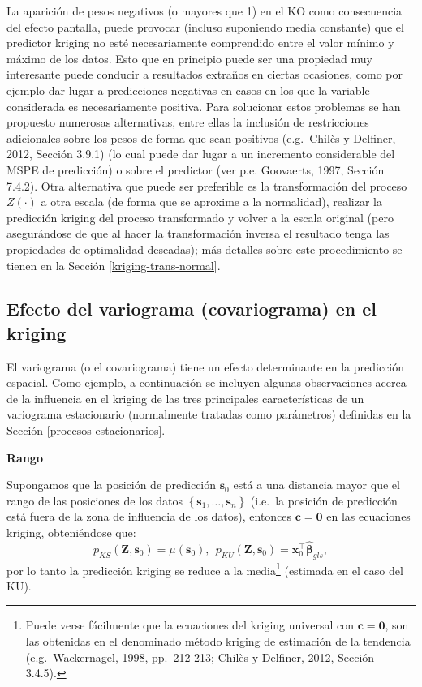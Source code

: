 \documentclass[
]{book}
\theoremstyle{break}
\theoremstyle{definition}
\theoremstyle{definition}
\theoremstyle{definition}
\theoremstyle{definition}
\theoremstyle{remark}
\begin{document}
La aparición de pesos negativos (o mayores que 1) en el KO como consecuencia del efecto pantalla, puede provocar (incluso suponiendo media constante) que el predictor kriging no esté necesariamente comprendido entre el valor mínimo y máximo de los datos.
Esto que en principio puede ser una propiedad muy interesante puede conducir a resultados extraños en ciertas ocasiones, como por ejemplo dar lugar a predicciones negativas en casos en los que la variable considerada es necesariamente positiva.
Para solucionar estos problemas se han propuesto numerosas alternativas, entre ellas la inclusión de restricciones adicionales sobre los pesos de forma que sean positivos (e.g.~Chilès y Delfiner, 2012, Sección 3.9.1) (lo cual puede dar lugar a un incremento considerable del MSPE de predicción) o sobre el predictor (ver p.e. Goovaerts, 1997, Sección 7.4.2).
Otra alternativa que puede ser preferible es la transformación del proceso \(Z(\cdot)\) a otra escala (de forma que se aproxime a la normalidad), realizar la predicción kriging del proceso transformado y volver a la escala original (pero asegurándose de que al hacer la transformación inversa el resultado tenga las propiedades de optimalidad deseadas); más detalles sobre este procedimiento se tienen en la Sección \ref{kriging-trans-normal}.

\subsection{Efecto del variograma (covariograma) en el kriging}\label{efecto-variog-kriging}

El variograma (o el covariograma) tiene un efecto determinante en la predicción espacial.
Como ejemplo, a continuación se incluyen algunas observaciones acerca de la influencia en el kriging de las tres principales características de un variograma estacionario (normalmente tratadas como parámetros) definidas en la Sección \ref{procesos-estacionarios}.

\textbf{Rango}

Supongamos que la posición de predicción \(\mathbf{s}_{0}\) está a una
distancia mayor que el rango de las posiciones de los datos \(\left\{ \mathbf{s}_{1}, \ldots,\mathbf{s}_{n} \right\}\) (i.e.~la posición de predicción está fuera de la zona de influencia de los datos), entonces \(\mathbf{c}=\mathbf{0}\) en las ecuaciones kriging, obteniéndose que:
\[p_{KS} (\mathbf{Z},\mathbf{s}_{0})=\mu(\mathbf{s}_{0}),\ \ p_{KU} (\mathbf{Z},\mathbf{s}_{0})=\mathbf{x}_0^\top\hat{\boldsymbol{\beta}}_{gls},\]
por lo tanto la predicción kriging se reduce a la media\footnote{Puede verse fácilmente que la ecuaciones del kriging universal con \(\mathbf{c}=\mathbf{0}\), son las obtenidas en el denominado método kriging de estimación de la tendencia (e.g.~Wackernagel, 1998, pp.~212-213; Chilès y Delfiner, 2012, Sección 3.4.5).} (estimada en el caso del KU).
\end{document}
